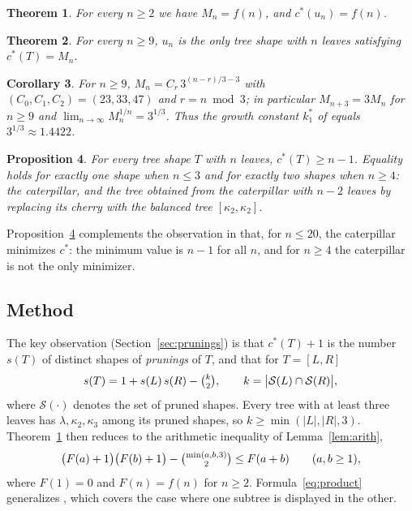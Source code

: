 \documentclass[11pt]{amsart}
\newtheorem{theorem}{Theorem}[section]
\newtheorem{proposition}[theorem]{Proposition}
\newtheorem{corollary}[theorem]{Corollary}
\theoremstyle{definition}
\theoremstyle{remark}
\newcommand{\lf}{\lambda}
\newcommand{\Sh}{\mathcal{S}}
\newcommand{\cstar}{c^{*}}
\newcommand{\binomtwo}[1]{\tbinom{#1}{2}}
\begin{document}
\begin{theorem}\label{thm:main}
For every $n\ge 2$ we have $M_n=f(n)$, and $\cstar(u_n)=f(n)$.
\end{theorem}

\begin{theorem}\label{thm:unique}
For every $n\ge 9$, $u_n$ is the only tree shape with $n$ leaves satisfying $\cstar(T)=M_n$.
\end{theorem}

\begin{corollary}\label{cor:growth}
For $n\ge 9$, $M_n=C_r\,3^{(n-r)/3-3}$ with $(C_0,C_1,C_2)=(23,33,47)$ and $r=n\bmod 3$; in particular $M_{n+3}=3M_n$ for $n\ge 9$ and $\lim_{n\to\infty} M_n^{1/n}=3^{1/3}$.
Thus the growth constant $k_1^*$ of \cite{DR2019} equals $3^{1/3}\approx 1.4422$.
\end{corollary}

\begin{proposition}\label{prop:min}
For every tree shape $T$ with $n$ leaves, $\cstar(T)\ge n-1$.
Equality holds for exactly one shape when $n\le 3$ and for exactly two shapes when $n\ge 4$: the caterpillar, and the tree obtained from the caterpillar with $n-2$ leaves by replacing its cherry with the balanced tree $[\kappa_2,\kappa_2]$.
\end{proposition}

Proposition~\ref{prop:min} complements the observation in \cite[Sect.~3.2]{DR2019} that, for $n\le 20$, the caterpillar minimizes $\cstar$: the minimum value is $n-1$ for all $n$, and for $n\ge 4$ the caterpillar is not the only minimizer.

\subsection*{Method}
The key observation (Section~\ref{sec:prunings}) is that $\cstar(T)+1$ is the number $s(T)$ of distinct shapes of \emph{prunings} of $T$, and that for $T=[L,R]$
\begin{equation}\label{eq:product}
s(T)=1+s(L)\,s(R)-\binomtwo{k},\qquad k=\bigl|\Sh(L)\cap\Sh(R)\bigr|,
\end{equation}
where $\Sh(\cdot)$ denotes the set of pruned shapes.
Every tree with at least three leaves has $\lf,\kappa_2,\kappa_3$ among its pruned shapes, so $k\ge\min(|L|,|R|,3)$.
Theorem~\ref{thm:main} then reduces to the arithmetic inequality of Lemma~\ref{lem:arith},
\[
\bigl(F(a)+1\bigr)\bigl(F(b)+1\bigr)-\binomtwo{\min(a,b,3)}\le F(a+b)\qquad(a,b\ge 1),
\]
where $F(1)=0$ and $F(n)=f(n)$ for $n\ge 2$.
Formula~\eqref{eq:product} generalizes \cite[eq.~(9)]{DR2019}, which covers the case where one subtree is displayed in the other.
\end{document}
